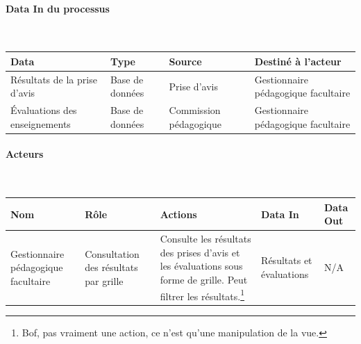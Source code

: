\documentclass[a4paper,11pt]{report}
\begin{document}
\paragraph{Data In du processus}~\newline{}

\begin{tabularx}{\linewidth}{|X|X|X|X|} \hline
Data & Type & Source & Destiné à l'acteur \\ \hline
Résultats de la prise d'avis & Base de données & Prise d'avis & Gestionnaire pédagogique facultaire \\
Évaluations des enseignements & Base de données & Commission pédagogique & Gestionnaire pédagogique facultaire \\ \hline
\end{tabularx}



\paragraph{Acteurs}~\newline{}

\begin{tabularx}{\linewidth}{|X|X|X|X|X|} \hline
Nom & Rôle & Actions & Data In & Data Out \\ \hline 
Gestionnaire pédagogique facultaire & Consultation des résultats par grille & Consulte les résultats des prises d'avis et les évaluations sous forme de grille. Peut filtrer les résultats.\footnote{Bof, pas vraiment une action, ce n'est qu'une manipulation de la vue.} & Résultats et évaluations & N/A \\ \hline
\end{tabularx}






\end{document}
